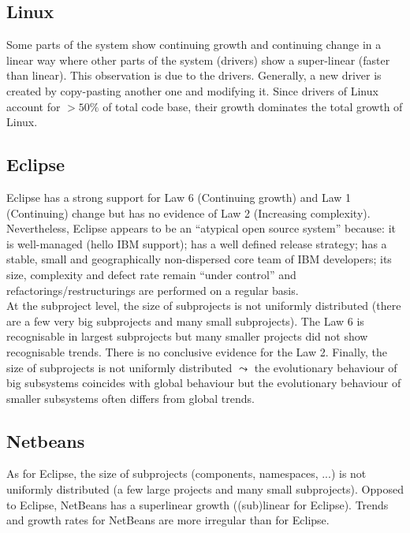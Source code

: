 \documentclass[a4paper,11pt]{report}
\begin{document}
\subsection{Linux}
Some parts of the system show continuing growth and continuing change in a
linear way where other parts of the system (drivers) show a super-linear
(faster than linear). This observation is due to the drivers.
Generally, a new driver is created by copy-pasting another one and modifying it.
Since drivers of Linux account for \underline{$>50\%$} of total code base,
their growth dominates the total growth of Linux.

\subsection{Eclipse}
Eclipse has a strong support for Law 6 (Continuing growth) and Law 1
(Continuing) change but has no evidence of Law 2 (Increasing complexity).
Nevertheless, Eclipse appears to be an ``atypical open source system'' because:
it is well-managed (hello IBM support); has a well defined release strategy;
has a stable, small and geographically non-dispersed core team of IBM
developers; its size, complexity and defect rate remain ``under control'' and
refactorings/restructurings are performed on a regular basis.\\

At the subproject level, the size of subprojects is not uniformly distributed
(there are a few very big subprojects and many small subprojects). The Law 6
is recognisable in largest subprojects but many smaller projects did not show
recognisable trends. There is no conclusive evidence for the Law 2. Finally,
the size of subprojects is not uniformly distributed $\leadsto$ the evolutionary
behaviour of big subsystems coincides with global behaviour but the evolutionary
behaviour of smaller subsystems often differs from global trends.

\subsection{Netbeans}
As for Eclipse, the size of subprojects (components, namespaces, ...) is not
uniformly distributed (a few large projects and many small subprojects).
Opposed to Eclipse, NetBeans has a superlinear growth ((sub)linear for Eclipse).
Trends and growth rates for NetBeans are more irregular than for Eclipse.
\end{document}
